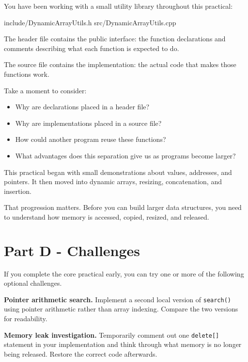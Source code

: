 \documentclass{csc2059practical}
\begin{document}
You have been working with a small utility library throughout this practical:

\begin{terminal}
include/DynamicArrayUtils.h
src/DynamicArrayUtils.cpp
\end{terminal}

The header file contains the public interface: the function declarations and comments describing what each function is expected to do.

The source file contains the implementation: the actual code that makes those functions work.

Take a moment to consider:
\begin{itemize}
  \item Why are declarations placed in a header file?
  \item Why are implementations placed in a source file?
  \item How could another program reuse these functions?
  \item What advantages does this separation give us as programs become larger?
\end{itemize}

\begin{reflectionbox}
This practical began with small demonstrations about values, addresses, and pointers. It then moved into dynamic arrays, resizing, concatenation, and insertion.

That progression matters. Before you can build larger data structures, you need to understand how memory is accessed, copied, resized, and released.
\end{reflectionbox}

\section{Part D - Challenges}


If you complete the core practical early, you can try one or more of the following optional challenges.

\begin{challengebox}
\textbf{Pointer arithmetic search.} Implement a second local version of \texttt{search()} using pointer arithmetic rather than array indexing. Compare the two versions for readability.
\end{challengebox}

\begin{challengebox}
\textbf{Memory leak investigation.} Temporarily comment out one \texttt{delete[]} statement in your implementation and think through what memory is no longer being released. Restore the correct code afterwards.
\end{challengebox}
\end{document}
